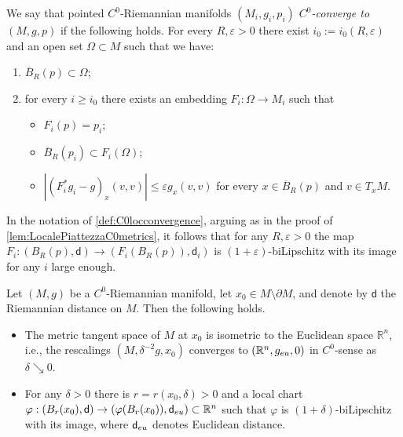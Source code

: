 \documentclass[a4paper,12pt,reqno]{amsart}
\numberwithin{equation}{section}
\theoremstyle{plain}
\theoremstyle{definition}
\theoremstyle{remark}
\newcommand{\R}{\mathbb{R}}
\newcommand{\eps}{\varepsilon}
\newcommand{\dist}{\mathsf{d}}
\begin{document}
{\begin{definition}[$C^0$-convergence]\label{def:C0locconvergence}
We say that pointed $C^0$-Riemannian manifolds \textit{$(M_i,g_i,p_i)$ $C^{0}$-converge to $(M,g,p)$} if the following holds. For every $R,\varepsilon>0$ there exist $i_0:=i_0(R,\varepsilon)$ and an open set $\Omega\subset  M$ such that we have:
\begin{enumerate}
\item $\overline{B}_R(p)\subset  \Omega$;
\item for every $i\geq i_0$ there exists an embedding $F_i:\Omega\to M_i$ such that 
\begin{itemize}
\item $F_i(p)=p_i$;
\item $\overline{B}_R(p_i)\subset  F_i(\Omega)$;
\item $ |(F_i^*g_i-g)_x(v,v)|\leq\varepsilon g_x(v,v)$ for every $x\in \overline{B}_R(p)$ and $v\in T_xM$.
\end{itemize}
\end{enumerate}
\end{definition}


\begin{remark}\label{rem:BiLipschitz}
In the notation of \cref{def:C0locconvergence}, arguing as in the proof of \cref{lem:LocalePiattezzaC0metrics}, it follows that for any $R,\eps>0$ the map $F_i:(B_R(p),\dist)\to (F_i(B_R(p)), \dist_i)$ is $(1+\eps)$-biLipschitz with its image for any $i$ large enough.
\end{remark}



\begin{lemma}\label{lem:LocalePiattezzaC0metrics}
Let $(M,g)$ be a $C^0$-Riemannian manifold, let $x_0 \in M\setminus\partial M$, and denote by $\dist$ the Riemannian distance on $M$. Then the following holds.
\begin{itemize}
    \item The metric tangent space of $M$ at $x_0$ is isometric to the Euclidean space $\R^n$, i.e., the rescalings $(M, \delta^{-2}g, x_0)$ converges to $(\R^n, g_{\rm eu}, 0)$ in $C^0$-sense as $\delta\searrow0$. 

    \item For any $\delta>0$ there is $r=r(x_0,\delta)>0$ and a local chart $\varphi: (B_r(x_0),\dist) \to (\varphi(B_r(x_0)), \dist_{\rm eu}) \subset \R^n$ such that $\varphi$ is $(1+\delta)$-biLipschitz with its image, where $\dist_{\rm eu}$ denotes Euclidean distance.
\end{itemize}
\end{lemma}

}
\end{document}
